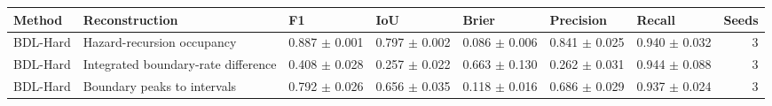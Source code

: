 \begin{tabular}{lllllllr}
\toprule
Method & Reconstruction & F1 & IoU & Brier & Precision & Recall & Seeds \\
\midrule
BDL-Hard & Hazard-recursion occupancy & 0.887 $\pm$ 0.001 & 0.797 $\pm$ 0.002 & 0.086 $\pm$ 0.006 & 0.841 $\pm$ 0.025 & 0.940 $\pm$ 0.032 & 3 \\
BDL-Hard & Integrated boundary-rate difference & 0.408 $\pm$ 0.028 & 0.257 $\pm$ 0.022 & 0.663 $\pm$ 0.130 & 0.262 $\pm$ 0.031 & 0.944 $\pm$ 0.088 & 3 \\
BDL-Hard & Boundary peaks to intervals & 0.792 $\pm$ 0.026 & 0.656 $\pm$ 0.035 & 0.118 $\pm$ 0.016 & 0.686 $\pm$ 0.029 & 0.937 $\pm$ 0.024 & 3 \\
\bottomrule
\end{tabular}
